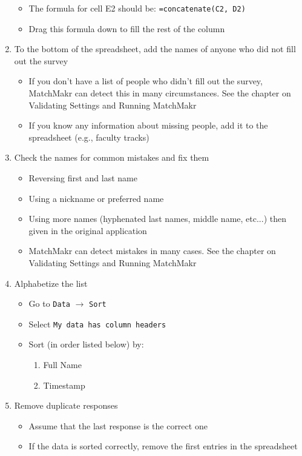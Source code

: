 \begin{enumerate}
\begin{itemize}
			\item The formula for cell E2 should be: \texttt{=concatenate(C2, D2)}
			\item Drag this formula down to fill the rest of the column
		\end{itemize}
	\item To the bottom of the spreadsheet, add the names of anyone who did not fill out the survey
		\begin{itemize}
			\item If you don't have a list of people who didn't fill out the survey, MatchMakr can detect this in many circumstances.  See the chapter on Validating Settings and Running MatchMakr
			\item If you know any information about missing people, add it to the spreadsheet (e.g., faculty tracks)
		\end{itemize}
	\item Check the names for common mistakes and fix them
		\begin{itemize}
			\item Reversing first and last name
			\item Using a nickname or preferred name
			\item Using more names (hyphenated last names, middle name, etc...) then given in the original application
			\item MatchMakr can detect mistakes in many cases.  See the chapter on Validating Settings and Running MatchMakr
		\end{itemize}
	\item Alphabetize the list
		\begin{itemize}
			\item Go to \texttt{Data} $\rightarrow$ \texttt{Sort}
			\item Select \texttt{My data has column headers}
			\item Sort (in order listed below) by:
				\begin{enumerate}
					\item Full Name
					\item Timestamp
				\end{enumerate}
		\end{itemize}
	\item Remove duplicate responses
		\begin{itemize}
			\item Assume that the last response is the correct one
			\item If the data is sorted correctly, remove the first entries in the spreadsheet

\end{itemize}
\end{enumerate}
